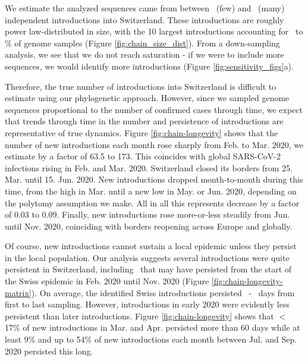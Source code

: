 \documentclass[9pt,twoside,lineno]{pnas-new} %
\begin{document}
We estimate the analyzed sequences came from between \nchainsmin\ (few) and \nchainsmax\ (many) independent introductions into Switzerland. These introductions are roughly power law-distributed in size, with the 10 largest introductions accounting for \maxlargestchainsper\ to \minlargestchainsper \% of genome samples (Figure \ref{fig:chain_size_dist}). From a down-sampling analysis, we see that we do not reach saturation - if we were to include more sequences, we would identify more introductions (Figure \ref{fig:sensitivity_figs}a). 


Therefore, the true number of introductions into Switzerland is difficult to estimate using our phylogenetic approach. However, since we sampled genome sequences proportional to the number of confirmed cases through time, we expect that trends through time in the number and persistence of introductions are representative of true dynamics. Figure \ref{fig:chain-longevity} shows that the number of new introductions each month rose sharply from Feb. to Mar. 2020, we estimate by a factor of 63.5 to 173. This coincides with global SARS-CoV-2 infections rising in Feb. and Mar. 2020. Switzerland closed its borders from 25. Mar. until 15. Jun. 2020. New introductions dropped month-to-month during this time, from the high in Mar. until a new low in May. or Jun. 2020, depending on the polytomy assumption we make. All in all this represents decrease by a factor of 0.03 to 0.09. Finally, new introductions rose more-or-less steadily from Jun. until Nov. 2020, coinciding with borders reopening across Europe and globally. 

Of course, new introductions cannot sustain a local epidemic unless they persist in the local population. Our analysis suggests several introductions were quite persistent in Switzerland, including \nspanningchainsfebnovmin\ that may have persisted from the start of the Swiss epidemic in Feb. 2020 until Nov. 2020 (Figure \ref{fig:chain-longevity-matrix}). On average, the identified Swiss introductions persisted \meantimetolastsamplemax\ - \meantimetolastsamplemin\ days from first to last sampling. However, introductions in early 2020 were evidently less persistent than later introductions. Figure \ref{fig:chain-longevity} shows that $<$ 17\% of new introductions in Mar. and Apr. persisted more than 60 days while at least 9\% and up to 54\% of new introductions each month between Jul. and Sep. 2020 persisted this long.
\end{document}
